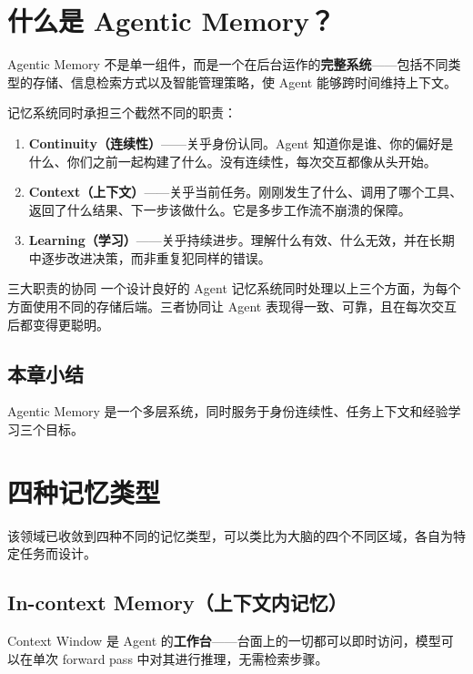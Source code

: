 \documentclass[a4paper]{article}
\begin{document}
\section{什么是 Agentic Memory？}

Agentic Memory 不是单一组件，而是一个在后台运作的\textbf{完整系统}——包括不同类型的存储、信息检索方式以及智能管理策略，使 Agent 能够跨时间维持上下文。

记忆系统同时承担三个截然不同的职责：

\begin{enumerate}[leftmargin=2em]
    \item \textbf{Continuity（连续性）}——关乎身份认同。Agent 知道你是谁、你的偏好是什么、你们之前一起构建了什么。没有连续性，每次交互都像从头开始。
    \item \textbf{Context（上下文）}——关乎当前任务。刚刚发生了什么、调用了哪个工具、返回了什么结果、下一步该做什么。它是多步工作流不崩溃的保障。
    \item \textbf{Learning（学习）}——关乎持续进步。理解什么有效、什么无效，并在长期中逐步改进决策，而非重复犯同样的错误。
\end{enumerate}

\begin{knowledgebox}{三大职责的协同}
一个设计良好的 Agent 记忆系统同时处理以上三个方面，为每个方面使用不同的存储后端。三者协同让 Agent 表现得一致、可靠，且在每次交互后都变得更聪明。
\end{knowledgebox}

\subsection{本章小结}

Agentic Memory 是一个多层系统，同时服务于身份连续性、任务上下文和经验学习三个目标。

\section{四种记忆类型}

该领域已收敛到四种不同的记忆类型，可以类比为大脑的四个不同区域，各自为特定任务而设计。

\subsection{In-context Memory（上下文内记忆）}

Context Window 是 Agent 的\textbf{工作台}——台面上的一切都可以即时访问，模型可以在单次 forward pass 中对其进行推理，无需检索步骤。
\end{document}
